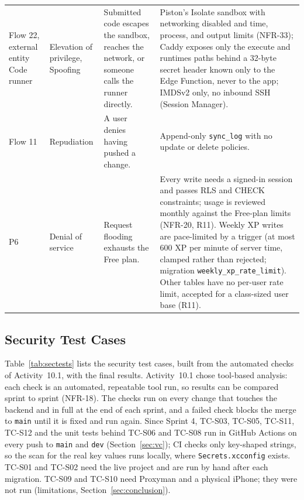 \documentclass[12pt,letterpaper]{article}
\begin{document}
\begin{xltabular}{\textwidth}{@{}L{2.1cm} L{2.4cm} Y Y@{}}
Flow 22, external entity Code runner & Elevation of privilege, Spoofing & Submitted code escapes the sandbox, reaches the network, or someone calls the runner directly. & Piston's Isolate sandbox with networking disabled and time, process, and output limits (NFR-33); Caddy exposes only the execute and runtimes paths behind a 32-byte secret header known only to the Edge Function, never to the app; IMDSv2 only, no inbound SSH (Session Manager). \\
Flow 11 & Repudiation & A user denies having pushed a change. & Append-only \texttt{sync\_log} with no update or delete policies. \\
P6 & Denial of service & Request flooding exhausts the Free plan. & Every write needs a signed-in session and passes RLS and CHECK constraints; usage is reviewed monthly against the Free-plan limits (NFR-20, R11). Weekly XP writes are pace-limited by a trigger (at most 600 XP per minute of server time, clamped rather than rejected; migration \texttt{weekly\_xp\_rate\_limit}). Other tables have no per-user rate limit, accepted for a class-sized user base (R11). \\
\end{xltabular}

\subsection{Security Test Cases}
Table~\ref{tab:sectests} lists the security test cases, built from the automated
checks of Activity~10.1, with the final results. Activity~10.1 chose
tool-based analysis: each check is an automated, repeatable tool run, so results can
be compared sprint to sprint (NFR-18). The checks run on every change that touches
the backend and in full at the end of each sprint, and a failed check blocks the merge
to \texttt{main} until it is fixed and run again. Since Sprint 4, TC-S03, TC-S05,
TC-S11, TC-S12 and the unit tests behind TC-S06 and TC-S08 run in GitHub Actions on
every push to \texttt{main} and \texttt{dev} (Section~\ref{sec:vc}); CI checks only
key-shaped strings, so the scan for the real key values runs locally, where
\texttt{Secrets.xcconfig} exists. TC-S01 and TC-S02 need the live project and are run
by hand after each migration. TC-S09 and TC-S10 need Proxyman and a physical iPhone;
they were not run (limitations, Section~\ref{sec:conclusion}).
\end{document}

